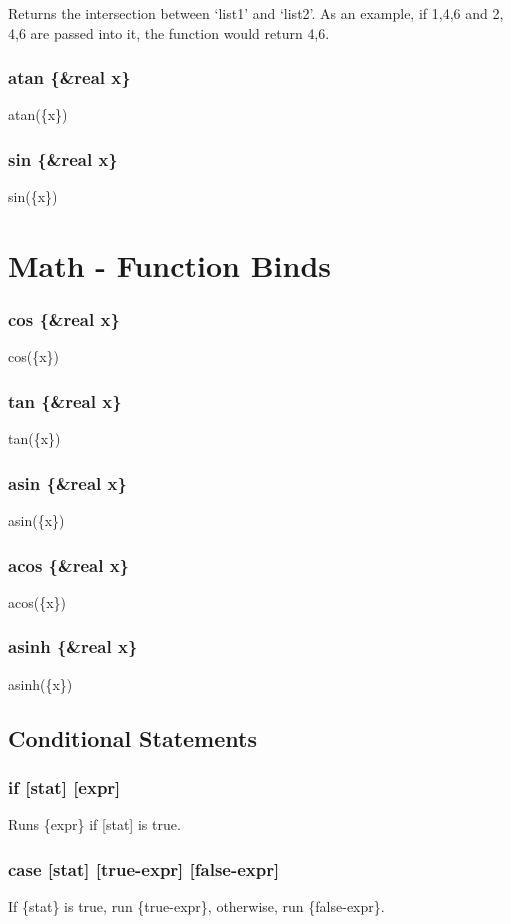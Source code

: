\documentclass{article}
\begin{document}
	Returns the intersection between `list1' and `list2'. As an example, if {1,4,6} and {2, 4,6} are passed into it, the function would return {4,6}.
	
	\subsubsection{atan \{\&real x\}}
	
	atan(\{x\})
	
	\subsubsection{sin \{\&real x\}}
	
	sin(\{x\})
	
	\section{Math - Function Binds}

	\subsubsection{cos \{\&real x\}}
	
	cos(\{x\})
	
	\subsubsection{tan \{\&real x\}}
	
	tan(\{x\})
	
	\subsubsection{asin \{\&real x\}}
	
	asin(\{x\})
	
	\subsubsection{acos \{\&real x\}}
	
	acos(\{x\})
	
	\subsubsection{asinh \{\&real x\}}
	
	asinh(\{x\})
	
	\newpage
	\subsection{Conditional Statements}
	
	\subsubsection{if [stat] [expr]}
	
	Runs \{expr\} if [stat] is true.
	
	\subsubsection{case [stat] [true-expr] [false-expr]}
	
	If \{stat\} is true, run \{true-expr\}, otherwise, run \{false-expr\}.
\end{document}
